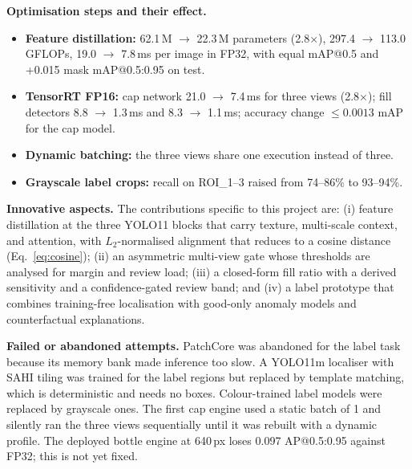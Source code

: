 \noindent\textbf{Optimisation steps and their effect.}
\begin{itemize}
    \item \textbf{Feature distillation:} 62.1\,M $\rightarrow$ 22.3\,M parameters (2.8$\times$), 297.4 $\rightarrow$ 113.0 GFLOPs, 19.0 $\rightarrow$ 7.8\,ms per image in FP32, with equal mAP@0.5 and +0.015 mask mAP@0.5:0.95 on test.
    \item \textbf{TensorRT FP16:} cap network 21.0 $\rightarrow$ 7.4\,ms for three views (2.8$\times$); fill detectors 8.8 $\rightarrow$ 1.3\,ms and 8.3 $\rightarrow$ 1.1\,ms; accuracy change $\leq0.0013$ mAP for the cap model.
    \item \textbf{Dynamic batching:} the three views share one execution instead of three.
    \item \textbf{Grayscale label crops:} recall on ROI\_1--3 raised from 74--86\% to 93--94\%.
\end{itemize}

\noindent\textbf{Innovative aspects.} The contributions specific to this project are: (i) feature distillation at the three YOLO11 blocks that carry texture, multi-scale context, and attention, with $L_2$-normalised alignment that reduces to a cosine distance (Eq.~\eqref{eq:cosine}); (ii) an asymmetric multi-view gate whose thresholds are analysed for margin and review load; (iii) a closed-form fill ratio with a derived sensitivity and a confidence-gated review band; and (iv) a label prototype that combines training-free localisation with good-only anomaly models and counterfactual explanations.

\noindent\textbf{Failed or abandoned attempts.} PatchCore was abandoned for the label task because its memory bank made inference too slow. A YOLO11m localiser with SAHI tiling was trained for the label regions but replaced by template matching, which is deterministic and needs no boxes. Colour-trained label models were replaced by grayscale ones. The first cap engine used a static batch of 1 and silently ran the three views sequentially until it was rebuilt with a dynamic profile. The deployed bottle engine at 640\,px loses 0.097 AP@0.5:0.95 against FP32; this is not yet fixed.


